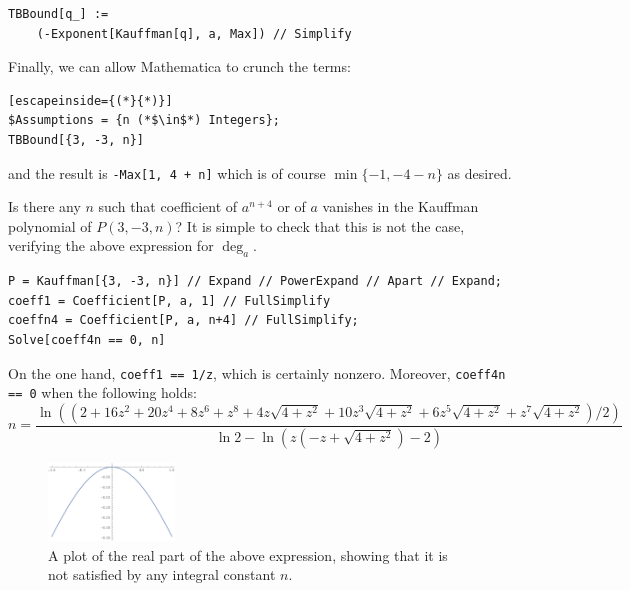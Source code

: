 \begin{lstlisting}
TBBound[q_] :=
    (-Exponent[Kauffman[q], a, Max]) // Simplify
\end{lstlisting}

Finally, we can allow Mathematica to crunch the terms:

\begin{lstlisting}[escapeinside={(*}{*)}]
$Assumptions = {n (*$\in$*) Integers};
TBBound[{3, -3, n}]
\end{lstlisting}

and the result is \lstinline|-Max[1, 4 + n]| which is of course $\min\{-1, -4-n\}$ as desired.

Is there any $n$ such that coefficient of $a^{n+4}$ or of $a$ vanishes in the Kauffman polynomial of $P(3, -3, n)$?
It is simple to check that this is not the case, verifying the above expression for $\deg_a$.

\begin{lstlisting}
P = Kauffman[{3, -3, n}] // Expand // PowerExpand // Apart // Expand;
coeff1 = Coefficient[P, a, 1] // FullSimplify
coeffn4 = Coefficient[P, a, n+4] // FullSimplify;
Solve[coeff4n == 0, n]
\end{lstlisting}

On the one hand, \lstinline|coeff1 == 1/z|, which is certainly nonzero. Moreover, \lstinline|coeff4n == 0| when the following holds:
\[
    n = \frac{ \ln\left((2 + 16 z^2 + 20 z^4 + 8 z^6 + z^8 + 4 z \sqrt{4 + z^2} + 10 z^3 \sqrt{4 + z^2} + 6 z^5 \sqrt{4 + z^2} + z^7 \sqrt{4 + z^2})/2\right)}{\ln 2 - \ln \left(z (-z + \sqrt{4 + z^2}) - 2\right)}
\]
\begin{figure}[h]
    \centering
    \includegraphics[width=0.3\textwidth]{images/mathematica-n.pdf}
    \caption{A plot of the real part of the above expression, showing that it is not satisfied by any integral constant $n$.}
\end{figure}



